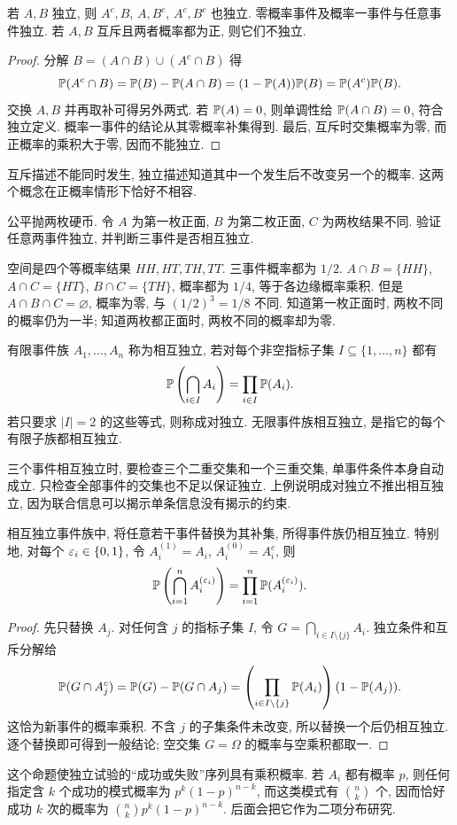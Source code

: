 \begin{proposition}
若 $A,B$ 独立, 则 $A^c,B$, $A,B^c$, $A^c,B^c$ 也独立. 零概率事件及概率一事件与任意事件独立. 若 $A,B$ 互斥且两者概率都为正, 则它们不独立.
\end{proposition}
\begin{proof}
分解 $B=(A\cap B)\cup(A^c\cap B)$ 得
\[
 \mathbb P(A^c\cap B)=\mathbb P(B)-\mathbb P(A\cap B)
 =(1-\mathbb P(A))\mathbb P(B)=\mathbb P(A^c)\mathbb P(B).
\]
交换 $A,B$ 并再取补可得另外两式. 若 $\mathbb P(A)=0$, 则单调性给 $\mathbb P(A\cap B)=0$, 符合独立定义. 概率一事件的结论从其零概率补集得到. 最后, 互斥时交集概率为零, 而正概率的乘积大于零, 因而不能独立.
\end{proof}
互斥描述不能同时发生, 独立描述知道其中一个发生后不改变另一个的概率. 这两个概念在正概率情形下恰好不相容.

\begin{example}
公平抛两枚硬币. 令 $A$ 为第一枚正面, $B$ 为第二枚正面, $C$ 为两枚结果不同. 验证任意两事件独立, 并判断三事件是否相互独立.
\end{example}
\begin{solution}
空间是四个等概率结果 $HH,HT,TH,TT$. 三事件概率都为 $1/2$. $A\cap B=\{HH\}$, $A\cap C=\{HT\}$, $B\cap C=\{TH\}$, 概率都为 $1/4$, 等于各边缘概率乘积. 但是 $A\cap B\cap C=\varnothing$, 概率为零, 与 $(1/2)^3=1/8$ 不同. 知道第一枚正面时, 两枚不同的概率仍为一半; 知道两枚都正面时, 两枚不同的概率却为零.
\end{solution}

\begin{definition}
有限事件族 $A_1,\ldots,A_n$ 称为相互独立, 若对每个非空指标子集 $I\subseteq\{1,\ldots,n\}$ 都有
\[
 \mathbb P\left(\bigcap_{i\in I}A_i\right)=\prod_{i\in I}\mathbb P(A_i).
\]
若只要求 $|I|=2$ 的这些等式, 则称成对独立. 无限事件族相互独立, 是指它的每个有限子族都相互独立.
\end{definition}
三个事件相互独立时, 要检查三个二重交集和一个三重交集, 单事件条件本身自动成立. 只检查全部事件的交集也不足以保证独立. 上例说明成对独立不推出相互独立, 因为联合信息可以揭示单条信息没有揭示的约束.

\begin{proposition}
相互独立事件族中, 将任意若干事件替换为其补集, 所得事件族仍相互独立. 特别地, 对每个 $\varepsilon_i\in\{0,1\}$, 令 $A_i^{(1)}=A_i$, $A_i^{(0)}=A_i^c$, 则
\[
 \mathbb P\left(\bigcap_{i=1}^n A_i^{(\varepsilon_i)}\right)
 =\prod_{i=1}^n\mathbb P(A_i^{(\varepsilon_i)}).
\]
\end{proposition}
\begin{proof}
先只替换 $A_j$. 对任何含 $j$ 的指标子集 $I$, 令 $G=\bigcap_{i\in I\setminus\{j\}}A_i$. 独立条件和互斥分解给
\[
 \mathbb P(G\cap A_j^c)=\mathbb P(G)-\mathbb P(G\cap A_j)
 =\left(\prod_{i\in I\setminus\{j\}}\mathbb P(A_i)\right)(1-\mathbb P(A_j)).
\]
这恰为新事件的概率乘积. 不含 $j$ 的子集条件未改变, 所以替换一个后仍相互独立. 逐个替换即可得到一般结论; 空交集 $G=\Omega$ 的概率与空乘积都取一.
\end{proof}
这个命题使独立试验的``成功或失败''序列具有乘积概率. 若 $A_i$ 都有概率 $p$, 则任何指定含 $k$ 个成功的模式概率为 $p^k(1-p)^{n-k}$, 而这类模式有 $\binom nk$ 个, 因而恰好成功 $k$ 次的概率为 $\binom nkp^k(1-p)^{n-k}$. 后面会把它作为二项分布研究.

